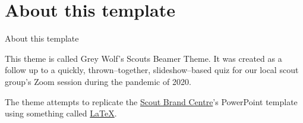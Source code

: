 %
%
%
%

\section{About this template}
\begin{frame}{About this template}
\parbox{\textwidth}{This theme is called \alert{Grey Wolf's Scouts Beamer Theme}.
It was created as a follow up to a quickly, thrown--together, slideshow--based quiz for our local scout group's Zoom session during the pandemic of 2020.}

\parbox{\textwidth}{The theme attempts to replicate the \href{https://scoutsbrand.org.uk/}{Scout Brand Centre}'s PowerPoint template using something called \href{https://www.latex-project.org/}{\LaTeX{}}.}
\end{frame}

